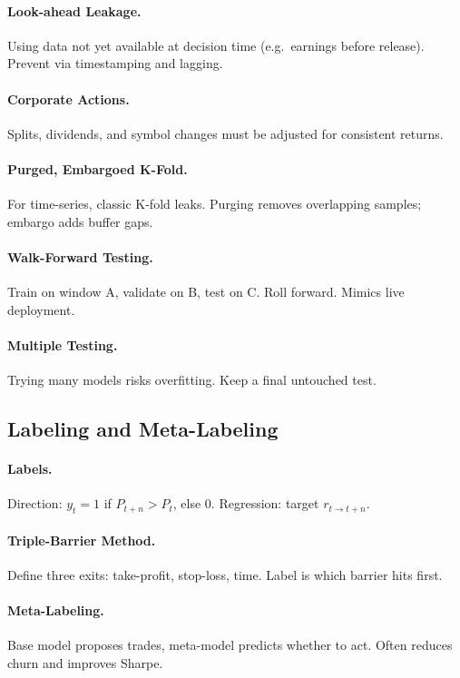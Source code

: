 \documentclass[11pt]{article}
\begin{document}
    \paragraph{Look-ahead Leakage.}
    Using data not yet available at decision time (e.g.\ earnings before release). Prevent via timestamping and lagging.

    \paragraph{Corporate Actions.}
    Splits, dividends, and symbol changes must be adjusted for consistent returns.

    \paragraph{Purged, Embargoed K-Fold.}
    For time-series, classic K-fold leaks. Purging removes overlapping samples; embargo adds buffer gaps.

    \paragraph{Walk-Forward Testing.}
    Train on window A, validate on B, test on C. Roll forward. Mimics live deployment.

    \paragraph{Multiple Testing.}
    Trying many models risks overfitting. Keep a final untouched test.

    \subsection{Labeling and Meta-Labeling}

    \paragraph{Labels.}
    Direction: $y_t=1$ if $P_{t+n}>P_t$, else 0. Regression: target $r_{t\to t+n}$.

    \paragraph{Triple-Barrier Method.}
    Define three exits: take-profit, stop-loss, time. Label is which barrier hits first.

    \paragraph{Meta-Labeling.}
    Base model proposes trades, meta-model predicts whether to act. Often reduces churn and improves Sharpe.
\end{document}
